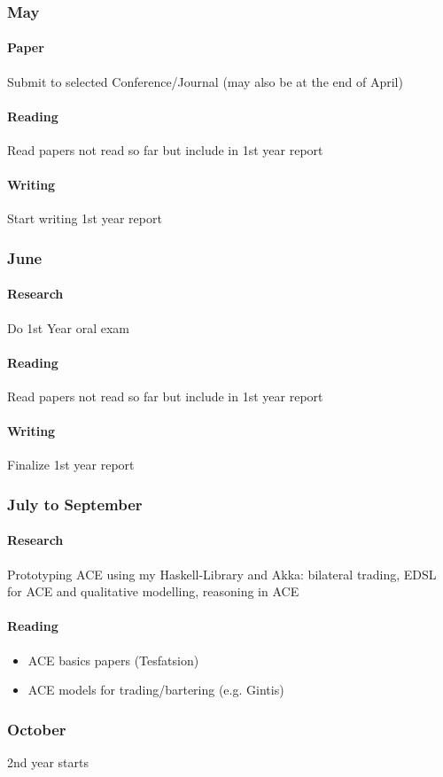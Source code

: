 \subsubsection{May}
\paragraph{Paper} Submit to selected Conference/Journal (may also be at the end of April)

\paragraph{Reading} Read papers  not read so far but include in 1st year report
	
\paragraph{Writing} Start writing 1st year report

\subsubsection{June}
\paragraph{Research} Do 1st Year oral exam

\paragraph{Reading} Read papers  not read so far but include in 1st year report

\paragraph{Writing} Finalize 1st year report

\subsubsection{July to September}
\paragraph{Research} Prototyping ACE using my Haskell-Library and Akka: bilateral trading, EDSL for ACE and qualitative modelling, reasoning in ACE
	
\paragraph{Reading}
	\begin{itemize}	
		\item ACE basics papers (Tesfatsion)
		\item ACE models for trading/bartering (e.g. Gintis)
	\end{itemize}
	 
\subsubsection{October}
2nd year starts